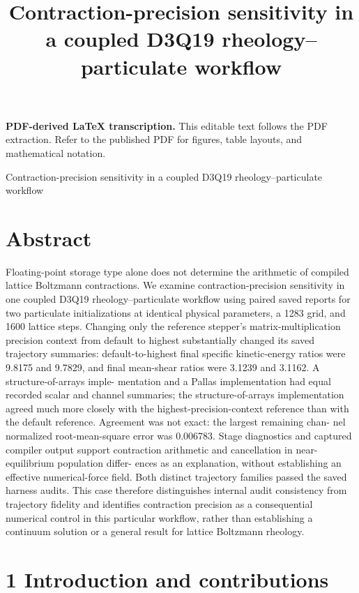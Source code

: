 \documentclass[11pt]{article}
\title{Contraction-precision sensitivity in a coupled D3Q19 rheology–particulate workflow}
\author{}
\date{}
\begin{document}
\maketitle
\noindent\textbf{PDF-derived LaTeX transcription.} This editable text follows the PDF extraction. Refer to the published PDF for figures, table layouts, and mathematical notation.


Contraction-precision sensitivity in a coupled D3Q19
rheology–particulate workflow

\section*{Abstract}

Floating-point storage type alone does not determine the arithmetic of compiled lattice
Boltzmann contractions. We examine contraction-precision sensitivity in one coupled D3Q19
rheology–particulate workflow using paired saved reports for two particulate initializations at
identical physical parameters, a 1283 grid, and 1600 lattice steps. Changing only the reference
stepper’s matrix-multiplication precision context from default to highest substantially changed
its saved trajectory summaries: default-to-highest final specific kinetic-energy ratios were 9.8175
and 9.7829, and final mean-shear ratios were 3.1239 and 3.1162. A structure-of-arrays imple-
mentation and a Pallas implementation had equal recorded scalar and channel summaries; the
structure-of-arrays implementation agreed much more closely with the highest-precision-context
reference than with the default reference. Agreement was not exact: the largest remaining chan-
nel normalized root-mean-square error was 0.006783. Stage diagnostics and captured compiler
output support contraction arithmetic and cancellation in near-equilibrium population differ-
ences as an explanation, without establishing an effective numerical-force field. Both distinct
trajectory families passed the saved harness audits. This case therefore distinguishes internal
audit consistency from trajectory fidelity and identifies contraction precision as a consequential
numerical control in this particular workflow, rather than establishing a continuum solution or
a general result for lattice Boltzmann rheology.

\section*{1 Introduction and contributions}
\end{document}
